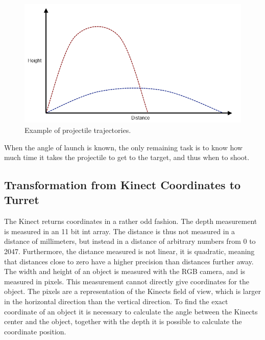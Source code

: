 \begin{figure}[hbtp]
\includegraphics[width=\textwidth]{img/projectile-trajectory-graph.png}
\caption{Example of projectile trajectories.} 
\label{fig:projectile-trajectory} 
\end{figure}

When the angle of launch is known, the only remaining task is to know how much time it takes the projectile to get to the target, and thus when to shoot.

\subsection{Transformation from Kinect Coordinates to Turret}
The Kinect returns coordinates in a rather odd fashion. The depth measurement is measured in an 11 bit int array\cite{kinectdistance}. The distance is thus not measured in a distance of millimeters, but instead in a distance of arbitrary numbers from 0 to 2047. Furthermore, the distance measured is not linear, it is quadratic, meaning that distances close to zero have a higher precision than distances further away.
The width and height of an object is measured with the RGB camera, and is measured in pixels. This measurement cannot directly give coordinates for the object. The pixels are a representation of the Kinects field of  view, which is larger in the horizontal direction than the vertical direction. To find the exact coordinate of an object it is necessary to calculate the angle between the Kinects center and the object, together with the depth it is possible to calculate the coordinate position.